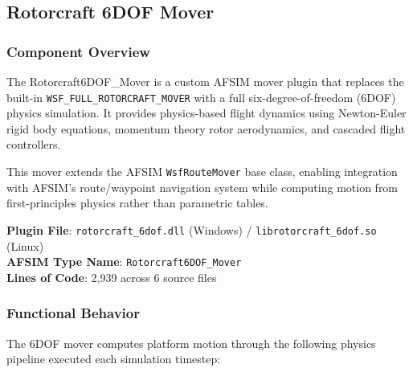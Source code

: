
\subsection{\unclass Rotorcraft 6DOF Mover}\label{sec:6DOFMover}

\subsubsection{\unclass Component Overview}\label{sec:6DOFOverview}

\unclass The Rotorcraft6DOF\_Mover is a custom AFSIM mover plugin that replaces the built-in \texttt{WSF\_FULL\_ROTORCRAFT\_MOVER} with a full six-degree-of-freedom (6DOF) physics simulation. It provides physics-based flight dynamics using Newton-Euler rigid body equations, momentum theory rotor aerodynamics, and cascaded flight controllers.

\unclass This mover extends the AFSIM \texttt{WsfRouteMover} base class, enabling integration with AFSIM's route/waypoint navigation system while computing motion from first-principles physics rather than parametric tables.

\unclass \textbf{Plugin File}: \texttt{rotorcraft\_6dof.dll} (Windows) / \texttt{librotorcraft\_6dof.so} (Linux)\\
\textbf{AFSIM Type Name}: \texttt{Rotorcraft6DOF\_Mover}\\
\textbf{Lines of Code}: 2,939 across 6 source files

\subsubsection{\unclass Functional Behavior}\label{sec:6DOFFunctionalBehavior}

\unclass The 6DOF mover computes platform motion through the following physics pipeline executed each simulation timestep:


